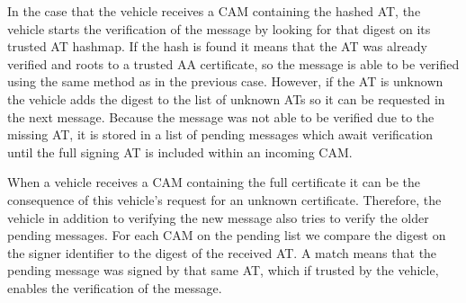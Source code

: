 In the case that the vehicle receives a CAM containing the hashed AT, the vehicle starts the verification of the message by looking for that digest on its trusted AT hashmap. If the hash is found it means that the AT was already verified and roots to a trusted AA certificate, so the message is able to be verified using the same method as in the previous case. However, if the AT is unknown the vehicle adds the digest to the list of unknown ATs so it can be requested in the next message. Because the message was not able to be verified due to the missing AT, it is stored in a list of pending messages which await verification until the full signing AT is included within an incoming CAM.

When a vehicle receives a CAM containing the full certificate it can be the consequence of this vehicle's request for an unknown certificate. Therefore, the vehicle in addition to verifying the new message also tries to verify the older pending messages. For each CAM on the pending list we compare the digest on the signer identifier to the digest of the received AT. A match means that the pending message was signed by that same AT, which if trusted by the vehicle, enables the verification of the message.

